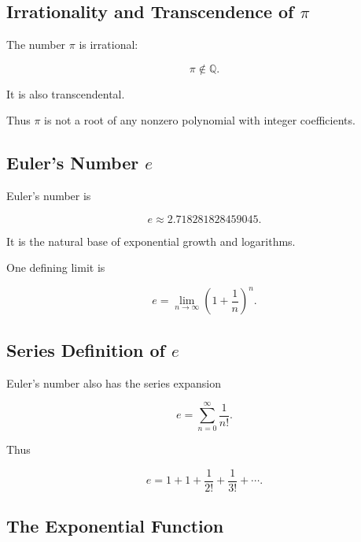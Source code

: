 \subsection{Irrationality and Transcendence of \(\pi\)}
\label{subsec:pi-irrational-transcendental}

The number \(\pi\) is irrational:

\[
\boxed{
\pi\notin\mathbb{Q}.
}
\]

It is also transcendental.

Thus \(\pi\) is not a root of any nonzero polynomial with integer
coefficients.

\subsection{Euler's Number \(e\)}
\label{subsec:euler-number-reference}

Euler's number is

\[
\boxed{
e
\approx
2.718281828459045.
}
\]

It is the natural base of exponential growth and logarithms.

One defining limit is

\[
\boxed{
e
=
\lim_{n\to\infty}
\left(
1+\frac1n
\right)^n.
}
\]

\subsection{Series Definition of \(e\)}
\label{subsec:e-series-definition}

Euler's number also has the series expansion

\[
\boxed{
e
=
\sum_{n=0}^{\infty}
\frac{1}{n!}.
}
\]

Thus

\[
e
=
1
+
1
+
\frac{1}{2!}
+
\frac{1}{3!}
+
\cdots.
\]

\subsection{The Exponential Function}
\label{subsec:natural-exponential-reference}

